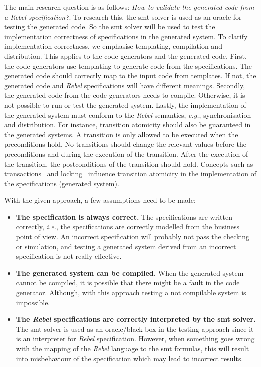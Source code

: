 The main research question is as follows: \textit{How to validate the generated code
from a Rebel specification?}. To research this, the \gls{smt} solver is used as
an oracle for testing the generated code. So the \gls{smt} solver will be used
to test the implementation correctness of specifications in the generated
system. To clarify implementation correctness, we emphasise templating,
compilation and distribution. This applies to the code generators and the
generated code.
First, the code generators use templating to generate code from the
specifications. The generated code should correctly map to the input code from
templates. If not, the generated code and \textit{Rebel} specifications will
have different meanings.
Secondly, the generated code from the code generators needs to compile.
Otherwise, it is not possible to run or test the generated system.
Lastly, the implementation of the generated system must conform to the
\textit{Rebel} semantics, \textit{e.g.}, synchronisation and distribution. For
instance, transition atomicity should also be guaranteed in the generated
systems. A transition is only allowed to be executed when the preconditions
hold. No transitions should change the relevant values before the preconditions
and during the execution of the transition. After the execution of the
transition, the postconditions of the transition should hold.
Concepts such as transactions~\cite[p.~6]{tanenbaum2017distributed} and
locking~\cite[p.~10]{tanenbaum2017distributed} influence transition atomicity in
the implementation of the specifications (generated system).

With the given approach, a few assumptions need to be made:
\begin{itemize}
\item \textbf{The specification is always correct.}
The specifications are written correctly, \textit{i.e.}, the specifications are
correctly modelled from the business point of view. An incorrect specification
will probably not pass the checking or simulation, and testing a generated
system derived from an incorrect specification is not really effective.
\item \textbf{The generated system can be compiled.} When the generated
system cannot be compiled, it is possible that there might be a fault in the
code generator. Although, with this approach testing a not compilable system is
impossible.
\item \textbf{The \textit{Rebel} specifications are correctly interpreted by the \gls{smt}
solver.} The \gls{smt} solver is used as an oracle/black box in the testing approach
since it is an interpreter for \textit{Rebel} specification. However, when
something goes wrong with the mapping of the \textit{Rebel} language to the \gls{smt}
formulas, this will result into misbehaviour of the specification which may lead
to incorrect results.
\end{itemize}

